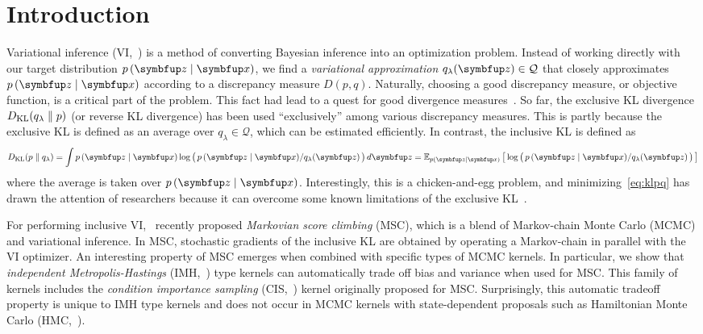 
\section{Introduction}
Variational inference (VI,~\citealt{jordan_introduction_1999, blei_variational_2017}) is a method of converting Bayesian inference into an optimization problem.
Instead of working directly with our target distribution \(p\,(\vz\mid\vx)\), we find a \textit{variational approximation} \(q_{\lambda}(\vz) \in \mathcal{Q}\) that closely approximates \(p\,(\vz\mid\vx)\) according to a discrepancy measure \(D(p, q)\).
Naturally, choosing a good discrepancy measure, or objective function, is a critical part of the problem.
This fact had lead to a quest for good divergence measures~\citep{NIPS2016_7750ca35, NIPS2017_35464c84, NEURIPS2018_1cd138d0, pmlr-v97-ruiz19a}.
So far, the exclusive KL divergence \(D_{\mathrm{KL}}(q_{\lambda}\parallel p)\) (or reverse KL divergence) has been used ``exclusively'' among various discrepancy measures.
This is partly because the exclusive KL is defined as an average over \(q_{\lambda} \in \mathcal{Q}\), which can be estimated efficiently.
In contrast, the inclusive KL is defined as
%
\begin{align}
  \DKL{p}{q_{\lambda}} = \int p\,(\vz\mid\vx) \log\big(\, p\,(\vz\mid\vx)/q_{\lambda}(\vz) \,\big)\,d\vz
  = \Esub{p(\vz\mid\vx)}{\log\big(\, p\,(\vz\mid\vx)/q_{\lambda}(\vz) \,\big) } \label{eq:klpq}
\end{align}
%
where the average is taken over \(p\,(\vz\mid\vx)\). 
Interestingly, this is a chicken-and-egg problem, and minimizing~\eqref{eq:klpq} has drawn the attention of researchers because it can overcome some known limitations of the exclusive KL~\citep{minka2005divergence, mackay_local_2001}.

For performing inclusive VI,~\citet{NEURIPS2020_b2070693, pmlr-v124-ou20a} recently proposed \textit{Markovian score climbing} (MSC), which is a blend of Markov-chain Monte Carlo (MCMC) and variational inference.
In MSC, stochastic gradients of the inclusive KL are obtained by operating a Markov-chain in parallel with the VI optimizer.
An interesting property of MSC emerges when combined with specific types of MCMC kernels.
In particular, we show that \textit{independent Metropolis-Hastings} (IMH,~\citealt{robert_monte_2004}) type kernels can automatically trade off bias and variance when used for MSC.
This family of kernels includes the \textit{condition importance sampling} (CIS,~\citealt{NEURIPS2020_b2070693}) kernel originally proposed for MSC.
Surprisingly, this automatic tradeoff property is unique to IMH type kernels and does not occur in MCMC kernels with state-dependent proposals such as Hamiltonian Monte Carlo (HMC,~\citealt{duane_hybrid_1987, neal_mcmc_2011, betancourt_conceptual_2017}).

